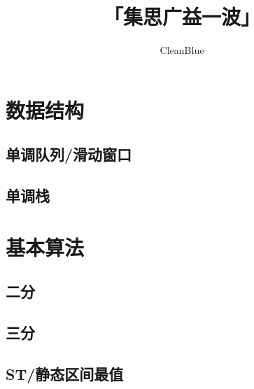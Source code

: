 \documentclass[twocolumn,a4]{article}
\title{\CJKfamily{hei} \bfseries 「集思广益一波」}
\author{CleanBlue}
\newcommand{\addcpp}[1]{}
\begin{document}
 \small
\begin{titlepage}
\maketitle
\end{titlepage}

\newpage
\pagestyle{empty}
\renewcommand{\contentsname}{目录}
\tableofcontents
\newpage\clearpage
\newpage
\pagestyle{fancy}
\setcounter{page}{1}   %

\section{数据结构}
	\subsection{单调队列/滑动窗口}
		\addcpp{ds/SlidingWindow.tex}
	\subsection{单调栈}
		\addcpp{ds/mono-stack.tex}
\section{基本算法}
	\subsection{二分}
		\addcpp{basic/binary_search.tex}
	\subsection{三分}
		\addcpp{basic/ternary_search.tex}
	\subsection{ST/静态区间最值}
		\addcpp{basic/sparse_table.tex }
\end{document}
